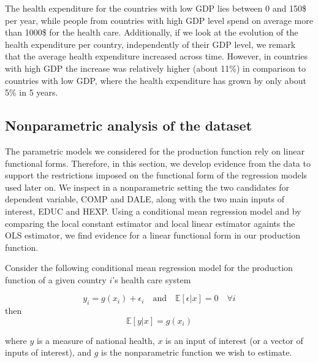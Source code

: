 \documentclass[12pt,a4paper]{article}\usepackage[]{graphicx}\usepackage[]{color}
\begin{document}


The health expenditure for the countries with low GDP lies between 0 and 150\$ per year, while people from countries with  high GDP level spend on average more than 1000\$ for the health care.  Additionally, if we look at the evolution of the health expenditure per country, independently of their GDP level, we remark that the average health expenditure increased across time. However, in countries with high GDP the increase was relatively higher (about 11\%) in comparison to countries with low GDP,  where the health expenditure has grown by only about 5\% in 5 years.

\subsection{Nonparametric analysis of the dataset}
The parametric models we considered for the production function rely on linear functional forms. Therefore, in this section, we develop evidence from the data to support the restrictions imposed on the functional form of the regression models used later on. We inspect in a nonparametric setting the two candidates for dependent variable, COMP and DALE, along with the two main inputs of interest, EDUC and HEXP. Using a conditional mean regression model and by comparing the local constant estimator and local linear estimator againts the OLS estimator, we find evidence for a linear functional form in our production function. 
 
Consider the following conditional mean regression model for the production function of a given country $i$'s health care system

$$
y_i = g(x_i) + \epsilon_i \quad \textrm{and} \quad \mathbb{E}[\epsilon|x]=0 \quad \forall i
$$
then
$$
\mathbb{E}[y|x]=g(x_i)
$$

where $y$ is a measure of national health, $x$ is an input of interest (or a vector of inputs of interest), and $g$ is the nonparametric function we wish to estimate.
 
\end{document}
